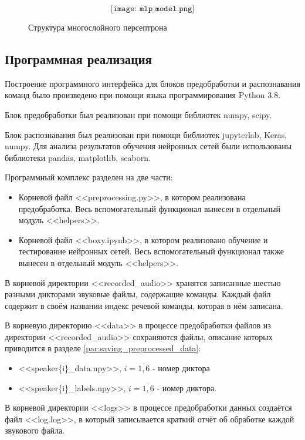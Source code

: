 \begin{figure}[H]
	\[\texttt{[image: mlp\_model.png]}\]
	\caption{Структура многослойного персептрона}
	\label{fig:cnn_model}
\end{figure}

\subsection{Программная реализация}
Построение программного интерфейса для блоков предобработки и распознавания команд было произведено при помощи языка программирования Python 3.8.

Блок предобработки был реализован при помощи библиотек numpy, scipy. 

Блок распознавания был реализован при помощи библиотек jupyterlab, Keras, numpy. Для анализа результатов обучения нейронных сетей были использованы библиотеки pandas, matplotlib, seaborn.

Программный комплекс разделен на две части:
\begin{itemize}[leftmargin=2cm]
	\item Корневой файл <<preprocessing.py>>, в котором реализована предобработка. Весь вспомогательный функционал вынесен в отдельный модуль <<helpers>>.
	\item Корневой файл <<boxy.ipynb>>, в котором реализовано обучение и тестирование нейронных сетей. Весь вспомогательный функционал также вынесен в отдельный модуль <<helpers>>.
\end{itemize}

В корневой директории <<recorded\_audio>> хранятся записанные шестью разными дикторами звуковые файлы, содержащие команды. Каждый файл содержит в своём названии индекс речевой команды, которая в нём записана.

В корневую директорию <<data>> в процессе предобработки файлов из директории <<recorded\_audio>> сохраняются файлы, описание которых приводится в разделе \ref{par:saving_preprocessed_data}:
\begin{itemize}[leftmargin=2cm]
	\item <<speaker\{i\}\_data.npy>>, $i=\overline{1,6}$ - номер диктора
	\item <<speaker\{i\}\_labels.npy>>, $i=\overline{1,6}$ - номер диктора.
\end{itemize}

В корневой директории <<logs>> в процессе предобработки данных создаётся файл <<log.log>>, в который записывается краткий отчёт об обработке каждой звукового файла.


